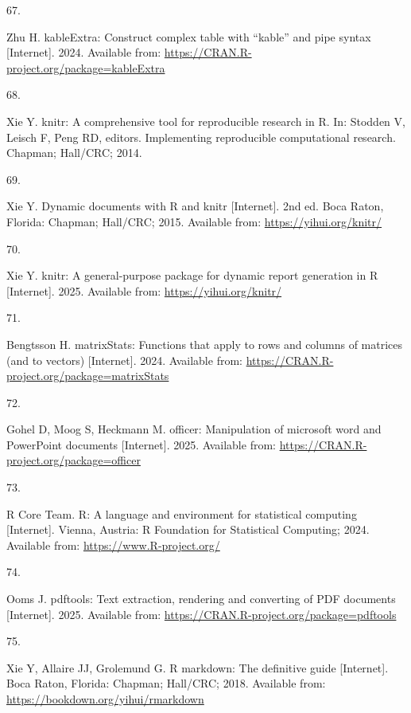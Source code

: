 \documentclass[
]{article}
\newlength{\cslhangindent}
\newlength{\csllabelwidth}
\newenvironment{CSLReferences}[2] %
 {\begin{list}{}{%
  \setlength{\itemindent}{0pt}
  \setlength{\leftmargin}{0pt}
  \setlength{\parsep}{0pt}
  \ifodd #1
   \setlength{\leftmargin}{\cslhangindent}
   \setlength{\itemindent}{-1\cslhangindent}
  \fi
  \setlength{\itemsep}{#2\baselineskip}}}
 {\end{list}}
\newcommand{\CSLLeftMargin}[1]{\parbox[t]{\csllabelwidth}{\strut#1\strut}}
\newcommand{\CSLRightInline}[1]{\parbox[t]{\linewidth - \csllabelwidth}{\strut#1\strut}}
\begin{document}
\begin{CSLReferences}{0}{1}
\CSLLeftMargin{67. }%
\CSLRightInline{Zhu H. {kableExtra}: Construct complex table with {``{kable}''} and pipe syntax {[}Internet{]}. 2024. Available from: \url{https://CRAN.R-project.org/package=kableExtra}}

\CSLLeftMargin{68. }%
\CSLRightInline{Xie Y. {knitr}: A comprehensive tool for reproducible research in {R}. In: Stodden V, Leisch F, Peng RD, editors. Implementing reproducible computational research. Chapman; Hall/CRC; 2014. }

\CSLLeftMargin{69. }%
\CSLRightInline{Xie Y. Dynamic documents with {R} and knitr {[}Internet{]}. 2nd ed. Boca Raton, Florida: Chapman; Hall/CRC; 2015. Available from: \url{https://yihui.org/knitr/}}

\CSLLeftMargin{70. }%
\CSLRightInline{Xie Y. {knitr}: A general-purpose package for dynamic report generation in {R} {[}Internet{]}. 2025. Available from: \url{https://yihui.org/knitr/}}

\CSLLeftMargin{71. }%
\CSLRightInline{Bengtsson H. {matrixStats}: Functions that apply to rows and columns of matrices (and to vectors) {[}Internet{]}. 2024. Available from: \url{https://CRAN.R-project.org/package=matrixStats}}

\CSLLeftMargin{72. }%
\CSLRightInline{Gohel D, Moog S, Heckmann M. {officer}: Manipulation of microsoft word and PowerPoint documents {[}Internet{]}. 2025. Available from: \url{https://CRAN.R-project.org/package=officer}}

\CSLLeftMargin{73. }%
\CSLRightInline{R Core Team. {R}: A language and environment for statistical computing {[}Internet{]}. Vienna, Austria: R Foundation for Statistical Computing; 2024. Available from: \url{https://www.R-project.org/}}

\CSLLeftMargin{74. }%
\CSLRightInline{Ooms J. {pdftools}: Text extraction, rendering and converting of PDF documents {[}Internet{]}. 2025. Available from: \url{https://CRAN.R-project.org/package=pdftools}}

\CSLLeftMargin{75. }%
\CSLRightInline{Xie Y, Allaire JJ, Grolemund G. R markdown: The definitive guide {[}Internet{]}. Boca Raton, Florida: Chapman; Hall/CRC; 2018. Available from: \url{https://bookdown.org/yihui/rmarkdown}}


\end{CSLReferences}
\end{document}
